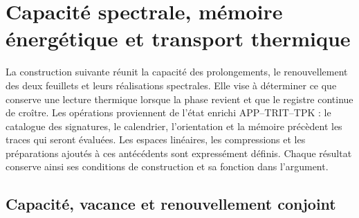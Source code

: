\section{Capacité spectrale, mémoire énergétique et transport thermique}
\label{sec:ii-ter27-antecedentes}

La construction suivante réunit la capacité des prolongements, le
renouvellement des deux feuillets et leurs réalisations spectrales. Elle vise à
déterminer ce que conserve une lecture thermique lorsque la phase revient et que le
registre continue de croître. Les opérations proviennent de l’état enrichi
APP--TRIT--TPK : le catalogue des signatures, le calendrier, l’orientation et la
mémoire précèdent les traces qui seront évaluées. Les espaces linéaires,
les compressions et les préparations ajoutés à ces antécédents
sont expressément définis. Chaque résultat conserve ainsi ses conditions de
construction et sa fonction dans l’argument.

\subsection{Capacité, vacance et renouvellement conjoint}
\label{sec:ii-ter27-capacidad}

